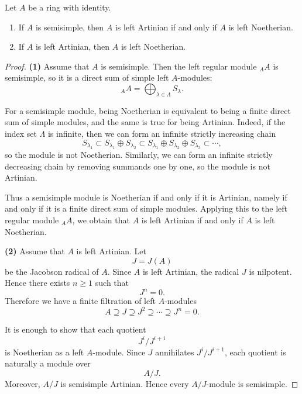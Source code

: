 \begin{lemma}\label{lem:artinian-noetherian}
    Let $A$ be a ring with identity.

    \begin{enumerate}
        \item If $A$ is semisimple, then $A$ is left Artinian if and only if $A$ is left
              Noetherian.

        \item If $A$ is left Artinian, then $A$ is left Noetherian.
    \end{enumerate}
\end{lemma}

\begin{proof}
    \textbf{(1)}
    Assume that $A$ is semisimple. Then the left regular module ${}_A A$ is semisimple,
    so it is a direct sum of simple left $A$-modules:
    \[
        {}_A A=\bigoplus_{\lambda\in \Lambda} S_\lambda .
    \]

    For a semisimple module, being Noetherian is equivalent to being a finite direct sum
    of simple modules, and the same is true for being Artinian. Indeed, if the index set
    $\Lambda$ is infinite, then we can form an infinite strictly increasing chain
    \[
        S_{\lambda_1}
        \subset
        S_{\lambda_1}\oplus S_{\lambda_2}
        \subset
        S_{\lambda_1}\oplus S_{\lambda_2}\oplus S_{\lambda_3}
        \subset \cdots ,
    \]
    so the module is not Noetherian. Similarly, we can form an infinite strictly decreasing
    chain by removing summands one by one, so the module is not Artinian.

    Thus a semisimple module is Noetherian if and only if it is Artinian, namely if and
    only if it is a finite direct sum of simple modules. Applying this to the left regular
    module ${}_A A$, we obtain that $A$ is left Artinian if and only if $A$ is left
    Noetherian.

    \medskip

    \textbf{(2)}
    Assume that $A$ is left Artinian. Let
    \[
        J=J(A)
    \]
    be the Jacobson radical of $A$. Since $A$ is left Artinian, the radical $J$ is nilpotent.
    Hence there exists $n\geq 1$ such that
    \[
        J^n=0.
    \]
    Therefore we have a finite filtration of left $A$-modules
    \[
        A\supseteq J\supseteq J^2\supseteq \cdots \supseteq J^n=0.
    \]

    It is enough to show that each quotient
    \[
        J^i/J^{i+1}
    \]
    is Noetherian as a left $A$-module. Since $J$ annihilates $J^i/J^{i+1}$, each quotient
    is naturally a module over
    \[
        A/J.
    \]
    Moreover, $A/J$ is semisimple Artinian. Hence every $A/J$-module is semisimple.


\end{proof}
